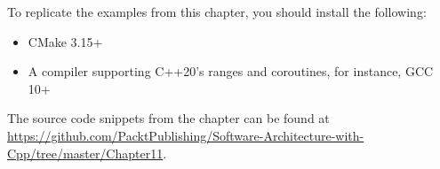 
To replicate the examples from this chapter, you should install the following:

\begin{itemize}
\item 
CMake 3.15+

\item 
A compiler supporting C++20's ranges and coroutines, for instance, GCC 10+
\end{itemize}

The source code snippets from the chapter can be found at \url{https://github.com/PacktPublishing/Software-Architecture-with-Cpp/tree/master/Chapter11}.